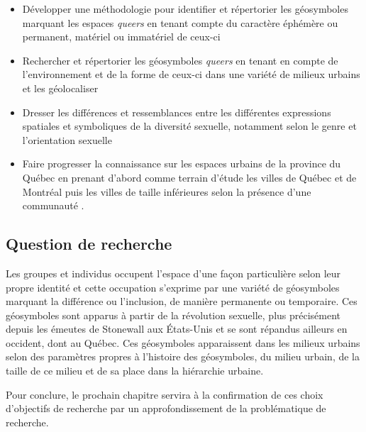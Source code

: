 \begin{itemize}
	\item Développer une méthodologie pour identifier et répertorier les géosymboles marquant les espaces \emph{queers} en tenant compte du caractère éphémère ou permanent, matériel ou immatériel de ceux-ci \;
	\item Rechercher et répertorier les géosymboles \emph{queers} en tenant en compte de l'environnement et de la forme de ceux-ci dans une variété de milieux urbains et les géolocaliser \;
	\item Dresser les différences et ressemblances entre les différentes expressions spatiales et symboliques de la diversité sexuelle, notamment selon le genre et l'orientation sexuelle \;
  \item Faire progresser la connaissance sur les espaces \lgbt{} urbains de la province du Québec en prenant d'abord comme terrain d'étude les villes de Québec et de Montréal puis les villes de taille inférieures selon la présence d'une communauté \lgbt.
\end{itemize}


\subsection*{Question de recherche} %
\label{sub:hypothese}

Les groupes et individus \lgbt{} occupent l'espace d'une façon particulière selon leur propre identité et cette occupation s'exprime par une variété de géosymboles marquant la différence ou l'inclusion, de manière permanente ou temporaire.
Ces géosymboles sont apparus à partir de la révolution sexuelle, plus précisément depuis les émeutes de Stonewall aux États-Unis et se sont répandus ailleurs en occident, dont au Québec.
Ces géosymboles apparaissent dans les milieux urbains selon des paramètres propres à l'histoire des géosymboles, du milieu urbain, de la taille de ce milieu et de sa place dans la hiérarchie urbaine.

Pour conclure, le prochain chapitre servira à la confirmation de ces choix d'objectifs de recherche par un approfondissement de la problématique de recherche.


